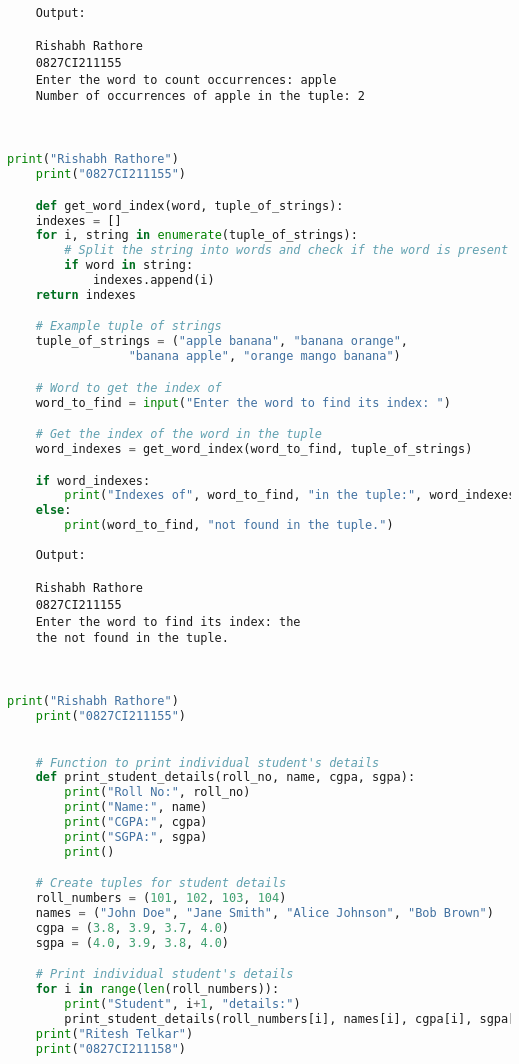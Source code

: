 \documentclass{report}
\begin{document}
\begin{verbatim}
	Output:

	Rishabh Rathore
	0827CI211155
	Enter the word to count occurrences: apple
	Number of occurrences of apple in the tuple: 2



\end{verbatim}


\bigskip

\sol 
\begin{lstlisting}[language=Python]
	print("Rishabh Rathore")
	print("0827CI211155")

	def get_word_index(word, tuple_of_strings):
    indexes = []
    for i, string in enumerate(tuple_of_strings):
        # Split the string into words and check if the word is present
        if word in string:
            indexes.append(i)
    return indexes

	# Example tuple of strings
	tuple_of_strings = ("apple banana", "banana orange",
				 "banana apple", "orange mango banana")

	# Word to get the index of
	word_to_find = input("Enter the word to find its index: ")

	# Get the index of the word in the tuple
	word_indexes = get_word_index(word_to_find, tuple_of_strings)

	if word_indexes:
		print("Indexes of", word_to_find, "in the tuple:", word_indexes)
	else:
		print(word_to_find, "not found in the tuple.")

\end{lstlisting}

\begin{verbatim}
	Output:

	Rishabh Rathore
	0827CI211155
	Enter the word to find its index: the
	the not found in the tuple.



\end{verbatim}


\bigskip

\sol 
\begin{lstlisting}[language=Python]
	print("Rishabh Rathore")
	print("0827CI211155")

	
	# Function to print individual student's details
	def print_student_details(roll_no, name, cgpa, sgpa):
		print("Roll No:", roll_no)
		print("Name:", name)
		print("CGPA:", cgpa)
		print("SGPA:", sgpa)
		print()

	# Create tuples for student details
	roll_numbers = (101, 102, 103, 104)
	names = ("John Doe", "Jane Smith", "Alice Johnson", "Bob Brown")
	cgpa = (3.8, 3.9, 3.7, 4.0)
	sgpa = (4.0, 3.9, 3.8, 4.0)

	# Print individual student's details
	for i in range(len(roll_numbers)):
		print("Student", i+1, "details:")
		print_student_details(roll_numbers[i], names[i], cgpa[i], sgpa[i])
	print("Ritesh Telkar")
	print("0827CI211158")
\end{lstlisting}
\end{document}
